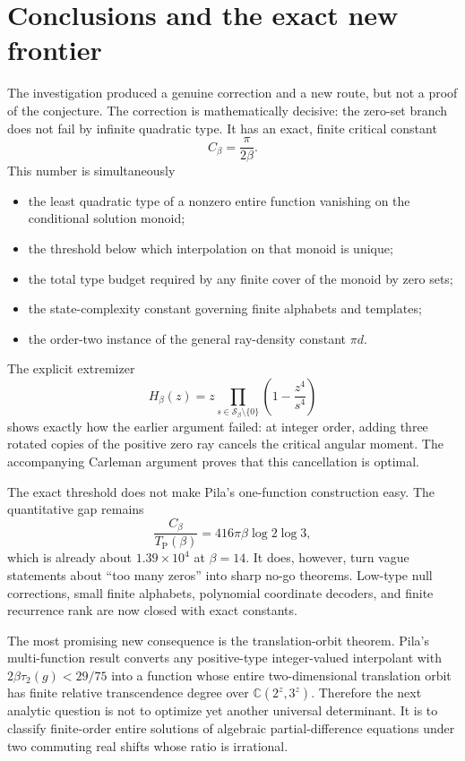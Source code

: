 \documentclass[11pt,oneside]{article}
\theoremstyle{definition}
\theoremstyle{remark}
\newcommand{\C}{\mathbb C}
\newcommand{\Sbeta}{\mathcal S_\beta}
\newcommand{\Cbeta}{C_\beta}
\newcommand{\TP}{T_{\mathrm P}(\beta)}
\begin{document}
\section{Conclusions and the exact new frontier}
\label{sec:conclusion}

The investigation produced a genuine correction and a new route, but not a proof of the
conjecture.  The correction is mathematically decisive: the zero-set branch does not fail by
infinite quadratic type.  It has an exact, finite critical constant
\[
 \boxed{\Cbeta=\frac{\pi}{2\beta}}.
\]
This number is simultaneously

\begin{itemize}
\item the least quadratic type of a nonzero entire function vanishing on the conditional
solution monoid;
\item the threshold below which interpolation on that monoid is unique;
\item the total type budget required by any finite cover of the monoid by zero sets;
\item the state-complexity constant governing finite alphabets and templates;
\item the order-two instance of the general ray-density constant $\pi d$.
\end{itemize}

The explicit extremizer
\[
 H_\beta(z)=z\prod_{s\in\Sbeta\setminus\{0\}}
                 \left(1-\frac{z^4}{s^4}\right)
\]
shows exactly how the earlier argument failed: at integer order, adding three rotated copies
of the positive zero ray cancels the critical angular moment.  The accompanying Carleman
argument proves that this cancellation is optimal.

The exact threshold does not make Pila's one-function construction easy.  The quantitative
gap remains
\[
 \frac{\Cbeta}{\TP}
 =416\pi\beta\log2\log3,
\]
which is already about $1.39\times10^4$ at $\beta=14$.  It does, however, turn vague
statements about ``too many zeros'' into sharp no-go theorems.  Low-type null corrections,
small finite alphabets, polynomial coordinate decoders, and finite recurrence rank are now
closed with exact constants.

The most promising new consequence is the translation-orbit theorem.  Pila's
multi-function result converts any positive-type integer-valued interpolant with
$2\beta\tau_2(g)<29/75$ into a function whose entire two-dimensional translation orbit has
finite relative transcendence degree over $\C(2^z,3^z)$.  Therefore the next analytic
question is not to optimize yet another universal determinant.  It is to classify
finite-order entire solutions of algebraic partial-difference equations under two commuting
real shifts whose ratio is irrational.
\end{document}
